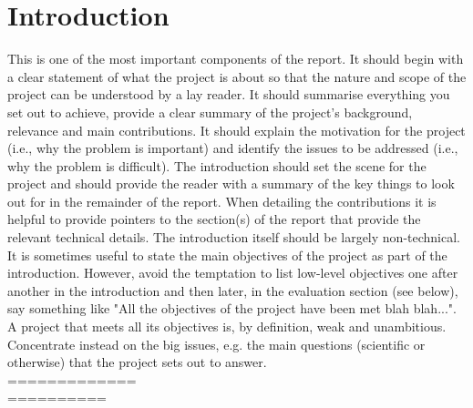 \documentclass[12pt,twoside]{article}
\begin{document}
\newpage

\section{Introduction}

This is one of the most important components of the report. It should begin with a clear statement of what the project is about so that the nature and scope of the project can be understood by a lay reader. It should summarise everything you set out to achieve, provide a clear summary of the project's background, relevance and main contributions. It should explain the motivation for the project (i.e., why the problem is important) and identify the issues to be addressed (i.e., why the problem is difficult). The introduction should set the scene for the project and should provide the reader with a summary of the key things to look out for in the remainder of the report. When detailing the contributions it is helpful to provide pointers to the section(s) of the report that provide the relevant technical details. The introduction itself should be largely non-technical. It is sometimes useful to state the main objectives of the project as part of the introduction. However, avoid the temptation to list low-level objectives one after another in the introduction and then later, in the evaluation section (see below), say something like "All the objectives of the project have been met blah blah...". A project that meets all its objectives is, by definition, weak and unambitious. Concentrate instead on the big issues, e.g. the main questions (scientific or otherwise) that the project sets out to answer.\\

=============\\


==========\\
\end{document}
